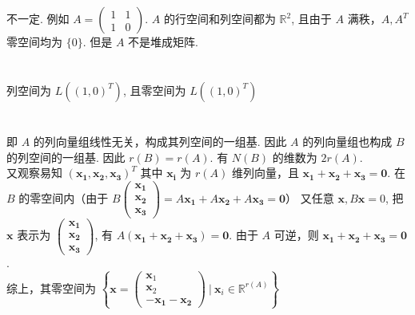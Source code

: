 \documentclass{article}
\begin{document}
\section{}

不一定. 例如 $A = \begin{pmatrix}
    1 & 1 \\ 1 & 0
\end{pmatrix}$. $A$ 的行空间和列空间都为 $\mathbb{R}^2$, 且由于 $A$ 满秩，$A, A^T$ 零空间均为 $\{0\}$. 但是 $A$ 不是堆成矩阵.

\section{}

列空间为 $L((1, 0)^T)$, 且零空间为 $L((1, 0)^T)$

\section{}

即 $A$ 的列向量组线性无关，构成其列空间的一组基. 因此 $A$ 的列向量组也构成 $B$ 的列空间的一组基. 因此 $r(B) = r(A)$. 有 $N(B)$ 的维数为 $2r(A)$. \\
又观察易知 $(\boldsymbol{x_1}, \boldsymbol{x_2}, \boldsymbol{x_3})^T$ 其中 $\boldsymbol{x_i}$ 为 $r(A)$ 维列向量，且 $\boldsymbol{x_1} + \boldsymbol{x_2} + \boldsymbol{x_3} = \boldsymbol{0}$. 在 $B$ 的零空间内（由于 $B\begin{pmatrix}
    \boldsymbol{x_1} \\ \boldsymbol{x_2} \\ \boldsymbol{x_3}
\end{pmatrix} = A\boldsymbol{x_1} + A\boldsymbol{x_2} + A\boldsymbol{x_3} = \boldsymbol{0}$）
又任意 $\boldsymbol{x}, B\boldsymbol{x} = 0$, 把 $\boldsymbol{x}$ 表示为 $\begin{pmatrix}
    \boldsymbol{x_1} \\ \boldsymbol{x_2} \\ \boldsymbol{x_3}
\end{pmatrix}$, 有 $A(\boldsymbol{x_1} + \boldsymbol{x_2} + \boldsymbol{x_3}) = \boldsymbol{0}$. 由于 $A$ 可逆，则 $\boldsymbol{x_1} + \boldsymbol{x_2} + \boldsymbol{x_3} = \boldsymbol{0}$. \\
综上，其零空间为 $\left\{\boldsymbol{x} = \begin{pmatrix}
    \boldsymbol{x}_1 \\ \boldsymbol{x}_2 \\ -\boldsymbol{x_1} - \boldsymbol{x_2}
\end{pmatrix}\ \Bigg| \ \boldsymbol{x}_i \in \mathbb{R}^{r(A)}\right\}$
\end{document}
